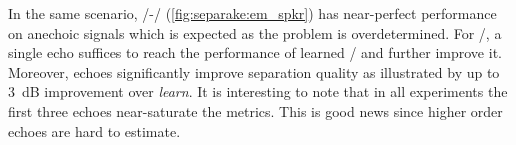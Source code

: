 \mynewline
In the same scenario, \EM/-\NMF/ (\cref{fig:separake:em_spkr}) has near-perfect performance on anechoic signals which is expected as the problem is overdetermined.
For \MU/, a single echo suffices to reach the performance of learned \RTFs/ and further improve it.
Moreover, echoes significantly improve separation quality as illustrated by up to 3~dB improvement over \textit{learn}.
It is interesting to note that in all experiments the first three echoes near-saturate the metrics.
This is good news since higher order echoes are hard to estimate.


